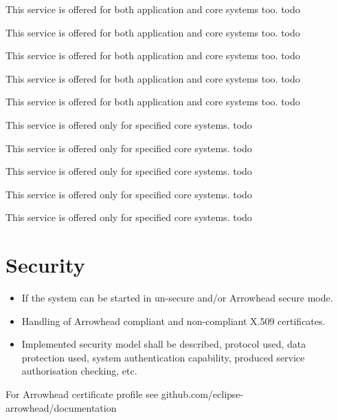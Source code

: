 \documentclass[a4paper]{arrowhead}
\begin{document}
This service is offered for both application and core systems too.
\color{red}todo\color{black}

This service is offered for both application and core systems too.
\color{red}todo\color{black}

This service is offered for both application and core systems too.
\color{red}todo\color{black}

This service is offered for both application and core systems too.
\color{red}todo\color{black}

This service is offered for both application and core systems too.
\color{red}todo\color{black}

This service is offered only for specified core systems.
\color{red}todo\color{black}

This service is offered only for specified core systems.
\color{red}todo\color{black}

This service is offered only for specified core systems.
\color{red}todo\color{black}

This service is offered only for specified core systems.
\color{red}todo\color{black}

This service is offered only for specified core systems.
\color{red}todo\color{black}

\newpage

\section{Security}
\label{sec:security}
\color{red}
\begin{itemize}
\item  If the system can be started in un-secure and/or
Arrowhead secure mode.
\item Handling of Arrowhead compliant and
non-compliant X.509 certificates.
\item Implemented security model shall be described, protocol used, data
protection used, system authentication capability, produced service
authorisation checking, etc.
\end{itemize}
For Arrowhead certificate profile
see github.com/eclipse-arrowhead/documentation
\color{black}
\end{document}
